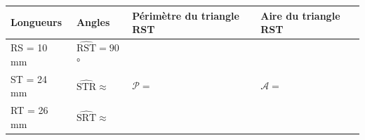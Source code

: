 \documentclass[exercice,a4]{thedocument}%
\begin{document}
\vspace{0,5cm}

\begin{tabularx}{\linewidth}{|*{4}{>{}X|}} \hline
	\textbf{Longueurs} & \textbf{Angles} & \textbf{Périmètre du triangle RST} & \textbf{Aire du triangle RST}\\ \hline

	\rule[-3mm]{0mm}{10mm}RS = 10 mm & $\widehat{\mathrm{RST}} = 90$° & \multirow{3}{*}{\rule{0mm}{12mm}$ \mathcal{P} = $}
	& \multirow{3}{*}{\rule{0mm}{12mm}$ \mathcal{A} = $}
	\\ \cline{1-2}
	\rule[-3mm]{0mm}{10mm}ST = 24 mm & $\widehat{\mathrm{STR}} \approx$ &&\\ \cline{1-2}
	\rule[-3mm]{0mm}{10mm}RT = 26 mm & $\widehat{\mathrm{SRT}} \approx$ &&\\ \hline

\end{tabularx}

\vspace{5mm}

\showthesource
\end{document}
